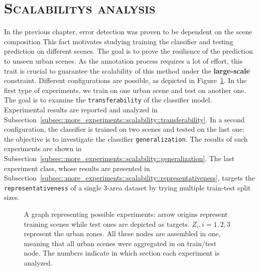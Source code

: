 \minitoc

\vfill

\clearpage

\section{\textsc{Scalabilitys analysis}}
    \label{sec::more_experiments::scalability}
    In the previous chapter, error detection was proven to be dependent on the scene composition
    This fact motivates studying training the classifier and testing prediction on different scenes.
    The goal is to prove the resilience of the prediction to unseen urban scenes.
    As the annotation process requires a lot of effort, this trait is crucial to guarantee the scalability of this method under the \textbf{large-scale} constraint.
    Different configurations are possible, as depicted in Figure~\ref{fig::scalability_study}.
    In the first type of experiments, we train on one urban scene and test on another one.
    The goal is to examine the \texttt{transferability} of the classifier model.
    Experimental results are reported and analyzed in Subsection~\ref{subsec::more_experiments::scalability::transferability}.
    In a second configuration, the classifier is trained on two scenes and tested on the last one: the objective is to investigate the classifier \texttt{generalization}.
    The results of such experiments are shown in Subsection~\ref{subsec::more_experiments::scalability::generalization}.
    The last experiment class, whose results are presented in Subsection~\ref{subsec::more_experiments::scalability::representativeness}, targets the \texttt{representativeness} of a single 3-area dataset by trying multiple train-test split sizes.

    \begin{figure}[htbp]
        \ffigbox[\FBwidth]{
            
        }
        {
            \caption{
                \label{fig::scalability_study}
                A graph representing possible experiments: arrow origins represent training scenes while test ones are depicted as targets.
                \(Z_i, i=1,2,3\) represent the urban zones.
                All these nodes are assembled in one, meaning that all urban scenes were aggregated in on train/test node.
                The numbers indicate in which section each experiment is analyzed.
            }
        }
    \end{figure}

